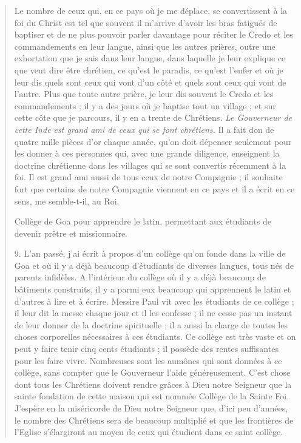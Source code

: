 \begin{quote}
Le nombre de ceux
qui, en ce pays où je me déplace, se convertissent à la foi du Christ
est tel que souvent il m'arrive d'avoir les bras fatigués de baptiser
et de ne plus pouvoir parler davantage pour réciter le Credo et les
commandements en leur langue, ainsi que les autres prières, outre
une exhortation que je sais dans leur langue, dans laquelle je leur
explique ce que veut dire être chrétien, ce qu'est le paradis, ce
qu'est l'enfer et où je leur dis quels sont ceux qui vont d'un côté
et quels sont ceux qui vont de l'autre. Plus que toute autre prière,
je leur dis souvent le Credo et les commandements ; il y a des jours
où je baptise tout un village ; et sur cette côte que je parcours, il
y en a trente de Chrétiens. \textit{Le Gouverneur de cette Inde est grand ami de ceux qui se font
chrétiens.} Il a fait don de quatre mille pièces d'or chaque année,
qu'on doit dépenser seulement pour les donner à ces personnes qui,
avec une grande diligence, enseignent la doctrine chrétienne dans
les villages qui se sont convertis récemment à la foi. Il est grand
ami aussi de tous ceux de notre Compagnie ; il souhaite fort que
  certains de notre Compagnie viennent en ce pays et il a écrit en ce
sens, me semble-t-il, au Roi.

\begin{Synthesis}
Collège de Goa pour apprendre le latin, permettant aux étudiants de devenir prêtre et missionnaire. 
\end{Synthesis}

9. L'an passé, j'ai écrit à propos d'un collège qu'on fonde dans
la ville de Goa et où il y a déjà beaucoup d'étudiants de diverses
langues, tous nés de parents infidèles. A l'intérieur du collège où
il y a déjà beaucoup de bâtiments construits, il y a parmi eux beaucoup
qui apprennent le latin et d'autres à lire et à écrire. Messire
Paul vit avec les étudiants de ce collège ; il leur dit la messe chaque
jour et il les confesse ; il ne cesse pas un instant de leur donner
de la doctrine spirituelle ; il a aussi la charge de toutes les choses
corporelles nécessaires à ces étudiants. Ce collège est très vaste
et on peut y faire tenir cinq cents étudiants ; il possède des rentes
suffisantes pour les faire vivre. Nombreuses sont les aumônes qui
sont données à ce collège, sans compter que le Gouverneur l'aide
généreusement. C'est chose dont tous les Chrétiens doivent rendre
grâces à Dieu notre Seigneur que la sainte fondation de cette maison
qui est nommée Collège de la Sainte Foi. J'espère en la miséricorde
de Dieu notre Seigneur que, d'ici peu d'années, le nombre
des Chrétiens sera de beaucoup multiplié et que les frontières de
l'Eglise s'élargiront au moyen de ceux qui étudient dans ce saint
collège.


\end{quote}
